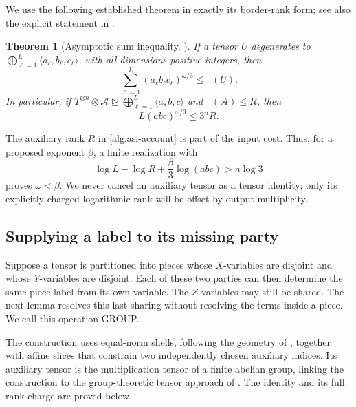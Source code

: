 \documentclass[11pt]{article}
\numberwithin{equation}{section}
\newtheorem{theorem}{Theorem}[section]
\theoremstyle{definition}
\theoremstyle{remark}
\DeclareMathOperator{\brank}{\underline R}
\begin{document}
We use the following established theorem in exactly its border-rank form;
see also the explicit statement in
\citet[Theorem~3.1]{afl}.

\begin{theorem}[Asymptotic sum inequality, \citet{schonhage}]
\label{thm:asi}
If a tensor \(U\) degenerates to
\(\bigoplus_{\ell=1}^{L}\langle a_\ell,b_\ell,c_\ell\rangle\), with all
dimensions positive integers, then
\[
 \sum_{\ell=1}^{L}(a_\ell b_\ell c_\ell)^{\omega/3}
 \leq\brank(U).
\]
In particular, if
\(T^{\otimes n}\otimes\mathcal A\unrhd
\bigoplus_{\ell=1}^{L}\langle a,b,c\rangle\)
and \(\brank(\mathcal A)\leq R\), then
\begin{equation}
 L(abc)^{\omega/3}\leq3^nR.
 \label{alg:asi-account}
\end{equation}
\end{theorem}

The auxiliary rank \(R\) in \eqref{alg:asi-account} is part of the input
cost.  Thus, for a proposed exponent \(\beta\), a finite realization with
\begin{equation}
 \log L-\log R+\frac{\beta}{3}\log(abc)>n\log3
 \label{alg:strict-score}
\end{equation}
proves \(\omega<\beta\).  We never cancel an auxiliary tensor as a tensor
identity; only its explicitly charged logarithmic rank will be offset by
output multiplicity.

\subsection{Supplying a label to its missing party}
\label{alg:group-section}
\label{sec:separation}

Suppose a tensor is partitioned into pieces whose \(X\)-variables are
disjoint and whose \(Y\)-variables are disjoint.  Each of these two parties
can then determine the same piece label from its own variable.  The
\(Z\)-variables may still be shared.  The next lemma resolves this last
sharing without resolving the terms inside a piece.  We call this operation
GROUP.

The construction uses equal-norm shells, following the geometry of
\citet{behrend}, together with affine slices that constrain two independently
chosen auxiliary indices.  Its auxiliary tensor is the multiplication
tensor of a finite abelian group, linking the construction to the
group-theoretic tensor approach of \citet{cohn-umans}.  The identity and its
full rank charge are proved below.
\end{document}
